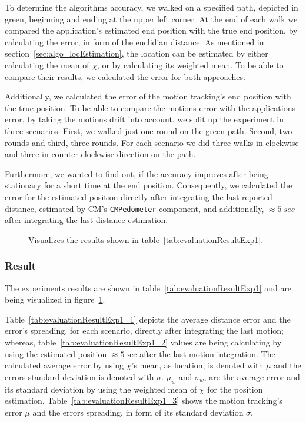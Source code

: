 To determine the algorithms accuracy, we walked on a specified path, depicted in green, beginning and ending at the upper left corner. At the end of each walk we compared the application's estimated end position with the true end position, by calculating the error, in form of the euclidian distance. As mentioned in section~\ref{sec:algo_locEstimation}, the location can be estimated by either calculating the mean of $\chi$, or by calculating its weighted mean. To be able to compare their results, we calculated the error for both approaches.

Additionally, we calculated the error of the motion tracking's end position with the true position. To be able to compare the motions error with the applications error, by taking the motions drift into account, we split up the experiment in three scenarios. First, we walked just one round on the green path. Second, two rounds and third, three rounds. For each scenario we did three walks in clockwise and three in counter-clockwise direction on the path.

Furthermore, we wanted to find out, if the accuracy improves after being stationary for a short time at the end position. Consequently, we calculated the error for the estimated position directly after integrating the last reported distance, estimated by \ac{CM}'s \texttt{CMPedometer} component, and additionally, $\approx 5~sec$ after integrating the last distance estimation.


\begin{table}
	
	\caption{Depicts the results of experiment~1.}
	\label{tab:evaluationResultExp1}
\end{table}

\begin{figure}
	
	\caption{Visualizes the results shown in table~\ref{tab:evaluationResultExp1}.}
	\label{fig:exp1_visualization}
\end{figure}

\subsubsection*{Result}
The experiments results are shown in table~\ref{tab:evaluationResultExp1} and are being visualized in figure~\ref{fig:exp1_visualization}.

Table~\ref{tab:evaluationResultExp1_1} depicts the average distance error and the error's spreading, for each scenario, directly after integrating the last motion; whereas, table~\ref{tab:evaluationResultExp1_2} values are being calculating by using the estimated position $\approx 5~\text{sec}$ after the last motion integration. The calculated average error by using $\chi$'s mean, as location, is denoted with $\mu$ and the errors standard deviation is denoted with $\sigma$. $\mu_w$ and $\sigma_w$, are the average error and its standard deviation by using the weighted mean of $\chi$ for the position estimation.
Table~\ref{tab:evaluationResultExp1_3} shows the motion tracking's error $\mu$ and the errors spreading, in form of its standard deviation $\sigma$.

